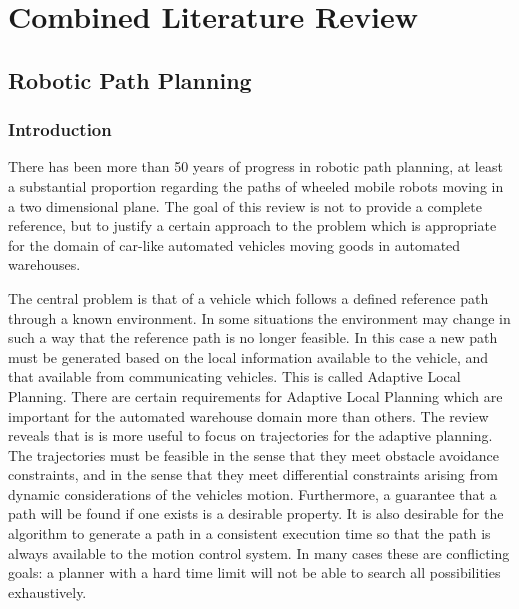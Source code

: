 \chapter{Combined Literature Review}


\section{Robotic Path Planning}

\subsection{Introduction}
There has been more than 50 years of progress in robotic path planning, at least a substantial proportion regarding the paths of wheeled mobile robots moving in a two dimensional plane. The goal of this review is not to provide a complete reference, but to justify a certain approach to the problem which is appropriate for the domain of car-like automated vehicles moving goods in automated warehouses.

The central problem is that of a vehicle which follows a defined reference path through a known environment. In some situations the environment may change in such a way that the reference path is no longer feasible. In this case a new path must be generated based on the local information available to the vehicle, and that available from communicating vehicles. This is called Adaptive Local Planning. There are certain requirements for Adaptive Local Planning which are important for the automated warehouse domain more than others. The review reveals that is is more useful to focus on trajectories for the adaptive planning. The trajectories must be feasible in the sense that they meet obstacle avoidance constraints, and in the sense that they meet differential constraints arising from dynamic considerations of the vehicles motion. Furthermore, a guarantee that a path will be found if one exists is a desirable property. It is also desirable for the algorithm to generate a path in a consistent execution time so that the path is always available to the motion control system. In many cases these are conflicting goals: a planner with a hard time limit will not be able to search all possibilities exhaustively. 

